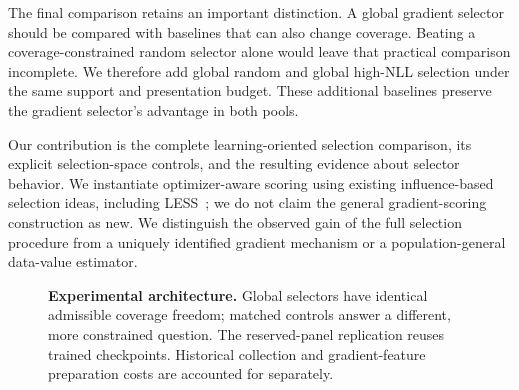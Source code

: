 \documentclass{article}
\begin{document}
The final comparison retains an important distinction. A global gradient selector should be compared with baselines that can also change coverage. Beating a coverage-constrained random selector alone would leave that practical comparison incomplete. We therefore add global random and global high-NLL selection under the same support and presentation budget. These additional baselines preserve the gradient selector's advantage in both pools.

Our contribution is the complete learning-oriented selection comparison, its explicit selection-space controls, and the resulting evidence about selector behavior. We instantiate optimizer-aware scoring using existing influence-based selection ideas, including LESS~\citep{xia2024less}; we do not claim the general gradient-scoring construction as new. We distinguish the observed gain of the full selection procedure from a uniquely identified gradient mechanism or a population-general data-value estimator.

\begin{figure}[t]
\centering
{}
\caption{\textbf{Experimental architecture.} Global selectors have identical admissible coverage freedom; matched controls answer a different, more constrained question. The reserved-panel replication reuses trained checkpoints. Historical collection and gradient-feature preparation costs are accounted for separately.}
\label{fig:architecture}
\end{figure}
\end{document}
